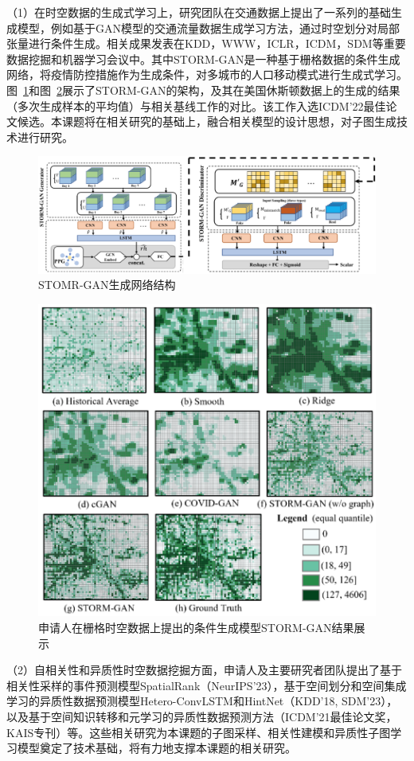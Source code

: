 \documentclass[12pt,UTF8,AutoFakeBold=2,a4paper]{ctexart} %
\begin{document}
（1）在时空数据的生成式学习上，研究团队在交通数据上提出了一系列的基础生成模型，例如基于GAN模型的交通流量数据生成学习方法，通过时空划分对局部张量进行条件生成。相关成果发表在KDD，WWW，ICLR，ICDM，SDM等重要数据挖掘和机器学习会议中。其中STORM-GAN是一种基于栅格数据的条件生成网络，将疫情防控措施作为生成条件，对多城市的人口移动模式进行生成式学习。图~\ref{fig:storm-gan-net}和图~\ref{fig:storm-gan}展示了STORM-GAN的架构，及其在美国休斯顿数据上的生成的结果（多次生成样本的平均值）与相关基线工作的对比。该工作入选ICDM'22最佳论文候选。本课题将在相关研究的基础上，融合相关模型的设计思想，对子图生成技术进行研究。
\begin{figure}
    \centering
    \includegraphics[width=0.9\linewidth]{fig/storm-gan-network.png}
    \caption{STOMR-GAN生成网络结构}
    \label{fig:storm-gan-net}
\end{figure}
\begin{figure}[h]
    \centering
\includegraphics[width=0.7\linewidth]{fig/storm-gan.png}
    \caption{申请人在栅格时空数据上提出的条件生成模型STORM-GAN结果展示}
    \label{fig:storm-gan}
\end{figure}

（2）自相关性和异质性时空数据挖掘方面，申请人及主要研究者团队提出了基于相关性采样的事件预测模型SpatialRank（NeurIPS'23），基于空间划分和空间集成学习的异质性数据预测模型Hetero-ConvLSTM和HintNet（KDD'18, SDM'23），以及基于空间知识转移和元学习的异质性数据预测方法（ICDM'21最佳论文奖，KAIS专刊）等。这些相关研究为本课题的子图采样、相关性建模和异质性子图学习模型奠定了技术基础，将有力地支撑本课题的相关研究。
\end{document}
